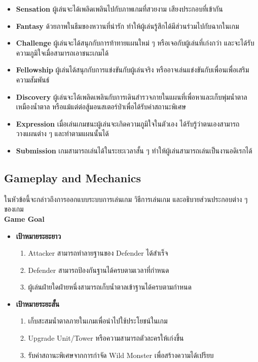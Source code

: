 \documentclass[12pt,oneside,openright,a4paper]{cpe-thai-project}
\begin{document}
\begin{enumerate}
\begin{itemize}
    \begin{itemize}
      \item \textbf{Sensation}  ผู้เล่นจะได้เพลิดเพลินไปกับภาพเกมที่สวยงาม เสียงประกอบที่เข้ากัน 
      \item \textbf{Fantasy}  ด้วยภาพในธีมของหวานที่น่ารัก ทำให้ผู้เล่นรู้สึกได้มีส่วนร่วมไปกับฉากในเกม
      \item \textbf{Challenge}  ผู้เล่นจะได้สนุกกับการท้าทายแผนใหม่ ๆ หรือเจอกับผู้เล่นที่เก่งกว่า และจะได้รับความภูมิใจเมื่อสามารถเอาชนะเกมได้
      \item \textbf{Fellowship}  ผู้เล่นได้สนุกกับการแข่งขันกับผู้เล่นจริง หรืออาจเล่นแข่งขันกับเพื่อนเพื่อเสริมความสัมพันธ์
      \item \textbf{Discovery}  ผู้เล่นจะได้เพลิดเพลินกับการเดินสำรวจภายในแผนที่เพื่อหาและเก็บพุ่มน้ำตาล เหมืองน้ำตาล หรือแม้แต่ต่อสู้มอนสเตอร์ป่าเพื่อได้รับค่าสถานะพิเศษ
      \item \textbf{Expression}  เมื่อเล่นเกมชนะผู้เล่นจะเกิดความภูมิใจในตัวเอง ได้รับรู้ว่าตนเองสามารถวางแผนต่าง ๆ และทำตามแผนนั้นได้
      \item \textbf{Submission}  เกมสามารถเล่นได้ในระยะเวลาสั้น ๆ ทำให้ผู้เล่นสามารถเล่นเป็นงานอดิเรกได้	
    \end{itemize}
  \end{itemize}
\end{enumerate}

\pagebreak
\subsection{Gameplay and Mechanics}
ในหัวข้อนี้จะกล่าวถึงการออกแบบระบบการเล่นเกม วิธีการเล่นเกม และอธิบายส่วนประกอบต่าง ๆ ของเกม\\

\textbf{Game Goal}
\begin{itemize}
  \item{\textbf{เป้าหมายระยะยาว}}
  \begin{enumerate}
    \item Attacker สามารถทำลายฐานของ Defender ได้สำเร็จ
    \item Defender สามารถป้องกันฐานได้ครบตามเวลาที่กำหนด
    \item ผู้เล่นฝ่ายใดฝ่ายหนึ่งสามารถเก็บน้ำตาลเข้าฐานได้ครบตามกำหนด
  \end{enumerate}
  
  \item{\textbf{เป้าหมายระยะสั้น}}
  \begin{enumerate}
    \item เก็บสะสมน้ำตาลภายในเกมเพื่อนำไปใช้ประโยชน์ในเกม
    \item Upgrade Unit/Tower หรือความสามารถตัวละครให้เก่งขึ้น
    \item รับค่าสถานะพิเศษจากการกำจัด Wild Monster เพื่อสร้างความได้เปรียบ
  \end{enumerate}
\end{itemize}
\end{document}
